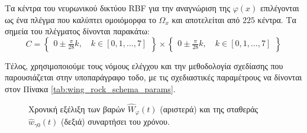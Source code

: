 	Τα κέντρα του νευρωνικού δικτύου RBF για την αναγνώριση της $\varphi(x)$ επιλέγονται ως ένα πλέγμα που καλύπτει ομοιόμορφα το $\Omega_x$ και αποτελείται από $225$ κέντρα. Τα σημεία του πλέγματος δίνονται παρακάτω:
	\begin{equation*}
	C = \begin{Bmatrix}
	0 \pm \frac{\pi }{28} k, \quad  k \in [0,1,...,7]
	\end{Bmatrix} \times
	\begin{Bmatrix}
	0 \pm  \frac{\pi }{28} k, \quad  k \in [0,1,...,7]
	\end{Bmatrix}
	\end{equation*}
	
	Τέλος, χρησιμοποιούμε τους νόμους ελέγχου και την μεθοδολογία σχεδίασης που παρουσιάζεται στην υποπαράγραφο τοδο, με τις σχεδιαστικές παραμέτρους να δίνονται στον Πίνακα \ref{tab:wing_rock_schema_params}.
	
	\begin{figure}
		\begin{subfigure}{0.5\textwidth}
			
		\end{subfigure}
		\begin{subfigure}{0.5\textwidth}
			
		\end{subfigure}
		\caption{ Χρονική εξέλιξη των βαρών $\hat{W}_\varphi(t)$ (αριστερά) και της σταθεράς $\hat{w}_{\gamma 0}(t)$ (δεξιά) συναρτήσει του χρόνου.}
		\label{fig:wing_rock_weights}
	\end{figure}

